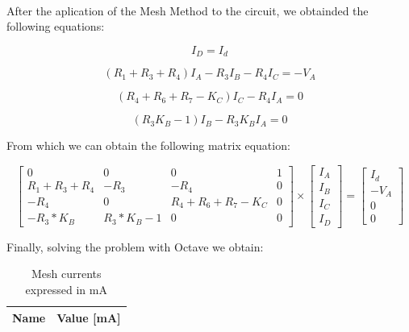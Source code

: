 \paragraph{} After the aplication of the Mesh Method to the circuit, we obtainded the following equations:

\begin{equation}
	I_D = I_d
	\label{eq:1}
\end{equation}

\begin{equation}
	(R_1 + R_3 + R_4) I_A -R_3 I_B - R_4 I_C = - V_A
	\label{eq:1}
\end{equation}

\begin{equation}
	(R_4 + R_6 + R_7 - K_C) I_C - R_4 I_A = 0
	\label{eq:2}
\end{equation}

\begin{equation}
	(R_3 K_B - 1) I_B - R_3 K_B I_A = 0
	\label{eq:3}
\end{equation}

From which we can obtain the following matrix equation:

\begin{equation}
\begin{bmatrix}
	0 & 0 & 0 & 1 \\
	R_1 + R_3 + R_4 &  -R_3 & - R_4 & 0 \\
	-R_4 & 0 & R_4 + R_6 + R_7 - K_C & 0 \\
	-R_3 * K_B & R_3 * K_B - 1 & 0 & 0
\end{bmatrix}
\times
\begin{bmatrix}
	I_A \\
	I_B \\
	I_C \\
	I_D
\end{bmatrix}
=
\begin{bmatrix}
	I_d \\
	-V_A \\
	0 \\
	0
	\label{m:1}
\end{bmatrix}
\end{equation}


Finally, solving the problem with Octave we obtain:

\begin{table}[hbt!]
  \centering
  \begin{tabular}{|l|r|}
    \hline    
    {\bf Name} & {\bf Value [mA]} \\ \hline
    
  \end{tabular}
  \caption{Mesh currents expressed in mA}
  \label{tab:op}
\end{table}

